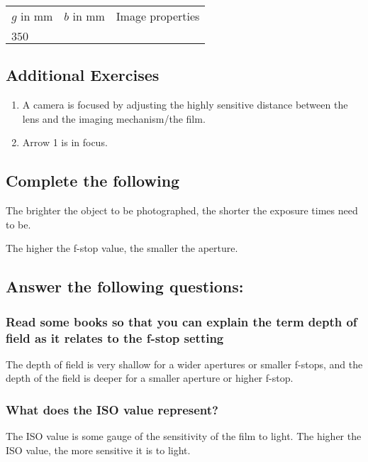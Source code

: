 \documentclass[12pt]{article}
\begin{document}
\begin{table}[]
\begin{tabular}{lll}
$g$ in mm & $b$ in mm & Image properties \\
 &  &  \\
$350$ &  & 
\end{tabular}
\end{table}

\subsection*{Additional Exercises}

\begin{enumerate}
\item A camera is focused by adjusting the highly sensitive distance between the lens and the imaging mechanism/the film.
\item Arrow 1 is in focus.
\end{enumerate}

\subsection*{Complete the following}

The brighter the object to be photographed, the shorter the exposure times need to be. 

\noindent The higher the f-stop value, the smaller the aperture.

\subsection*{Answer the following questions:}

\subsubsection*{Read some books so that you can explain the term depth of field as it relates to the f-stop setting}

The depth of field is very shallow for a wider apertures or smaller f-stops, and the depth of the field is deeper for a smaller aperture or higher f-stop.

\subsubsection*{What does the ISO value represent?}

The ISO value is some gauge of the sensitivity of the film to light. The higher the ISO value, the more sensitive it is to light.
\end{document}
